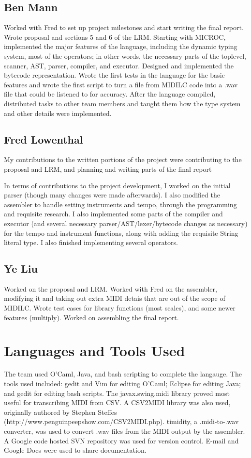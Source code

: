 \documentclass[12pt,A4]{book}
\begin{document}
\subsection{Ben Mann}
Worked with Fred to set up project milestones and start writing the final report.  Wrote proposal and sections 5 and 6 of the LRM.  Starting with MICROC, implemented the major features of the language, including the dynamic typing system, most of the operators; in other words, the necessary parts of the toplevel, scanner, AST, parser, compiler, and executor.  Designed and implemented the bytecode representation.  Wrote the first tests in the language for the basic features and wrote the first script to turn a file from MIDILC code into a .wav file that could be listened to for accuracy.  After the language compiled, distributed tasks to other team members and taught them how the type system and other details were implemented.

\subsection{Fred Lowenthal}
My contributions to the written portions of the project were contributing to the proposal and LRM, and planning and writing parts of the final report 

In terms of contributions to the project development, I worked on the initial parser (though many changes were made afterwards).  I also modified the assembler to handle setting instruments and tempo, through the programming and requisite research.  I also implemented some parts of the compiler and executor (and several necessary parser/AST/lexer/bytecode changes as necessary) for the tempo and instrument functions, along with adding the requisite String literal type.  I also finished implementing several operators.
\subsection{Ye Liu}
Worked on the proposal and LRM. Worked with Fred on the assembler, modifying it and taking out extra MIDI detais that are out of the scope of MIDILC. Wrote test cases for library functions (most scales), and some newer features (multiply). Worked on assembling the final report.

\section{Languages and Tools Used}
The team used O'Caml, Java, and bash scripting to complete the langauge. The tools used included: gedit and Vim for editing O'Caml; Eclipse for editing Java; and gedit for editing bash scripts. The javax.swing.midi library proved most useful for transcribing MIDI from CSV. A CSV2MIDI library was also used, originally authored by Stephen Steffes (http://www.penguinpeepshow.com/CSV2MIDI.php). timidity, a .midi-to-.wav converter, was used to convert .wav files from the MIDI output by the assembler. A Google code hosted SVN repository was used for version control. E-mail and Google Docs were used to share documentation.
\end{document}
